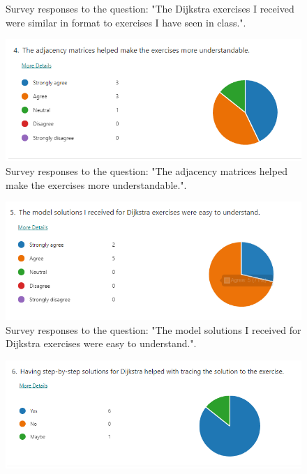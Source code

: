 \documentclass{l4proj}
\begin{document}
\begin{appendices}
\begin{figure}[h]
    \caption{Survey responses to the question: "The Dijkstra exercises I received were similar in format to exercises I have seen in class.".}
    \label{fig:d_similar_format} 
\end{figure}

\begin{figure}[h]
    \centering
    \includegraphics[width=0.9\linewidth]{images/adjacency_matrix.png}    

    \caption{Survey responses to the question: "The adjacency matrices helped make the exercises more understandable.".}
    \label{fig:adjacency_matrix} 
\end{figure}

\begin{figure}[h]
    \centering
    \includegraphics[width=0.9\linewidth]{images/d_model_solution.png}    

    \caption{Survey responses to the question: "The model solutions I received for Dijkstra exercises were easy to understand.".}
    \label{fig:d_model_solution} 
\end{figure}

\begin{figure}[h]
    \centering
    \includegraphics[width=0.9\linewidth]{images/d_step_by_step.png}    


\end{figure}
\end{appendices}
\end{document}

